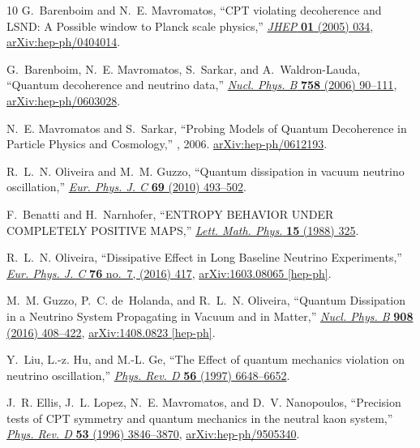 \documentclass[aps, prd, onecolumn, tightenlines, notitlepage, superscriptaddress, nofootinbib, preprintnumbers, floatfix,showkeys,11pt]{revtex4-2}
\begin{document}
\begin{thebibliography}{10}
G.~Barenboim and N.~E. Mavromatos, ``{CPT violating decoherence and LSND: A
  Possible window to Planck scale physics},''
  \href{http://dx.doi.org/10.1088/1126-6708/2005/01/034}{{\em JHEP} {\bfseries
  01} (2005) 034}, \href{http://arxiv.org/abs/hep-ph/0404014}{{\ttfamily
  arXiv:hep-ph/0404014}}.

G.~Barenboim, N.~E. Mavromatos, S.~Sarkar, and A.~Waldron-Lauda, ``{Quantum
  decoherence and neutrino data},''
  \href{http://dx.doi.org/10.1016/j.nuclphysb.2006.09.012}{{\em Nucl. Phys. B}
  {\bfseries 758} (2006) 90--111},
  \href{http://arxiv.org/abs/hep-ph/0603028}{{\ttfamily arXiv:hep-ph/0603028}}.

N.~E. Mavromatos and S.~Sarkar, ``{Probing Models of Quantum Decoherence in
  Particle Physics and Cosmology},''
, 2006.
\newblock \href{http://arxiv.org/abs/hep-ph/0612193}{{\ttfamily
  arXiv:hep-ph/0612193}}.

R.~L.~N. Oliveira and M.~M. Guzzo, ``{Quantum dissipation in vacuum neutrino
  oscillation},'' \href{http://dx.doi.org/10.1140/epjc/s10052-010-1388-1}{{\em
  Eur. Phys. J. C} {\bfseries 69} (2010) 493--502}.

F.~Benatti and H.~Narnhofer, ``{ENTROPY BEHAVIOR UNDER COMPLETELY POSITIVE
  MAPS},'' \href{http://dx.doi.org/10.1007/BF00419590}{{\em Lett. Math. Phys.}
  {\bfseries 15} (1988) 325}.

R.~L.~N. Oliveira, ``{Dissipative Effect in Long Baseline Neutrino
  Experiments},'' \href{http://dx.doi.org/10.1140/epjc/s10052-016-4253-z}{{\em
  Eur. Phys. J. C} {\bfseries 76} no.~7, (2016) 417},
  \href{http://arxiv.org/abs/1603.08065}{{\ttfamily arXiv:1603.08065
  [hep-ph]}}.

M.~M. Guzzo, P.~C. de~Holanda, and R.~L.~N. Oliveira, ``{Quantum Dissipation in
  a Neutrino System Propagating in Vacuum and in Matter},''
  \href{http://dx.doi.org/10.1016/j.nuclphysb.2016.04.030}{{\em Nucl. Phys. B}
  {\bfseries 908} (2016) 408--422},
  \href{http://arxiv.org/abs/1408.0823}{{\ttfamily arXiv:1408.0823 [hep-ph]}}.

Y.~Liu, L.-z. Hu, and M.-L. Ge, ``{The Effect of quantum mechanics violation on
  neutrino oscillation},''
  \href{http://dx.doi.org/10.1103/PhysRevD.56.6648}{{\em Phys. Rev. D}
  {\bfseries 56} (1997) 6648--6652}.

J.~R. Ellis, J.~L. Lopez, N.~E. Mavromatos, and D.~V. Nanopoulos, ``{Precision
  tests of CPT symmetry and quantum mechanics in the neutral kaon system},''
  \href{http://dx.doi.org/10.1103/PhysRevD.53.3846}{{\em Phys. Rev. D}
  {\bfseries 53} (1996) 3846--3870},
  \href{http://arxiv.org/abs/hep-ph/9505340}{{\ttfamily arXiv:hep-ph/9505340}}.


\end{thebibliography}
\end{document}
